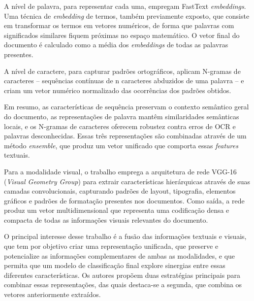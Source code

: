 A nível de palavra, para representar cada uma, empregam FastText \textit{embeddings}. Uma técnica de \textit{embedding} de termos, também previamente exposto, que consiste em transformar os termos em vetores numéricos, de forma que palavras com significados similares fiquem próximas no espaço matemático. O vetor final do documento é calculado como a média dos \textit{embeddings} de todas as palavras presentes.

A nível de caractere, para capturar padrões ortográficos, aplicam N-gramas de caracteres -- sequências contínuas de n caracteres abduzidos de uma palavra -- e criam um vetor numérico normalizado das ocorrências dos padrões obtidos.

Em resumo, as características de sequência preservam o contexto semântico geral do documento, as representações de palavra mantêm similaridades semânticas locais, e os N-gramas de caracteres oferecem robustez contra erros de OCR e palavras desconhecidas. Essas três representações são combinadas através de um método \textit{ensemble}, que produz um vetor unificado que comporta essas \textit{features} textuais.

Para a modalidade visual, o trabalho emprega a arquitetura de rede VGG-16 (\textit{Visual Geometry Group}) para extrair características hierárquicas através de suas camadas convolucionais, capturando padrões de layout, tipografia, elementos gráficos e padrões de formatação presentes nos documentos. Como saída, a rede produz um vetor multidimensional que representa uma codificação densa e compacta de todas as informações visuais relevantes do documento.

O principal interesse desse trabalho é a fusão das informações textuais e visuais, que tem por objetivo criar uma representação unificada, que preserve e potencialize as informações complementares de ambas as modalidades, e que permita que um modelo de classificação final explore sinergias entre essas diferentes características. Os autores propõem duas estratégias principais para combinar essas representações, das quais destaca-se a segunda, que combina os vetores anteriormente extraídos.

